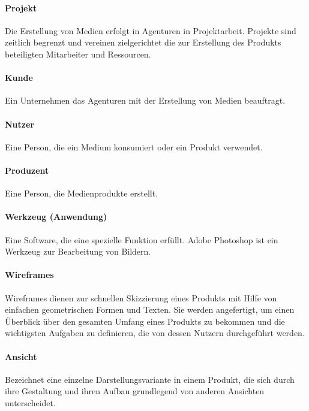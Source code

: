 \paragraph{Projekt} Die Erstellung von Medien erfolgt in Agenturen in Projektarbeit. Projekte sind zeitlich begrenzt und vereinen zielgerichtet die zur Erstellung des Produkts beteiligten Mitarbeiter und Ressourcen. 

\paragraph{Kunde} Ein Unternehmen das Agenturen mit der Erstellung von Medien beauftragt.

\paragraph{Nutzer} Eine Person, die ein Medium konsumiert oder ein Produkt verwendet.

\paragraph{Produzent} Eine Person, die Medienprodukte erstellt.

\paragraph{Werkzeug (Anwendung)} Eine Software, die eine spezielle Funktion erfüllt. Adobe Photoshop ist ein Werkzeug zur Bearbeitung von Bildern.

\paragraph{Wireframes} Wireframes dienen zur schnellen Skizzierung eines Produkts mit Hilfe von einfachen geometrischen Formen und Texten. Sie werden angefertigt, um einen Überblick über den gesamten Umfang eines Produkts zu bekommen und die wichtigsten Aufgaben zu definieren, die von dessen Nutzern durchgeführt werden.

\paragraph{Ansicht} Bezeichnet eine einzelne Darstellungsvariante in einem Produkt, die sich durch ihre Gestaltung und ihren Aufbau grundlegend von anderen Ansichten unterscheidet.

\pagebreak